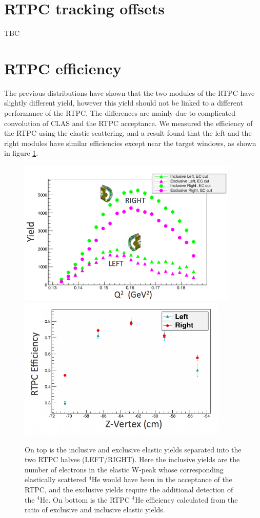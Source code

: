 \section{RTPC tracking offsets}
TBC

\section{RTPC efficiency}
The previous distributions have shown that the two modules of the RTPC have 
slightly different yield, however this yield should not be linked to a different 
performance of the RTPC. The differences are mainly due to complicated 
convolution of CLAS and the RTPC acceptance. We measured the efficiency of the 
RTPC using the elastic scattering, and a result found that the left and the 
right modules have similar efficiencies except near the target windows, as 
shown in figure \ref{fig:rtpc_eff}.

\begin{figure}[tbp]
\centering
\hspace{+0.3in}\includegraphics[width=10.5cm]{fig_rtpc/tpceffyields.png}
\includegraphics[width=10cm]{fig_rtpc/tpceff.png}
\caption{On top is the inclusive and exclusive elastic yields separated into
 the two RTPC halves (LEFT/RIGHT).  Here the inclusive yields are the
 number of electrons in the elastic W-peak
 whose corresponding elastically scattered $^4$He would have been in the
 acceptance of the RTPC, and the exclusive yields require the additional
 detection of the $^4$He. On
 bottom is the RTPC $^4$He efficiency calculated from the ratio of exclusive
 and inclusive elastic yields.
 \label{fig:rtpc_eff}}
 \end{figure}


